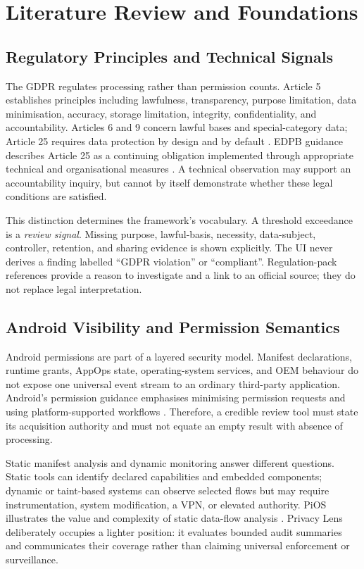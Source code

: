 \section{Literature Review and Foundations}

\subsection{Regulatory Principles and Technical Signals}

The GDPR regulates processing rather than permission counts. Article 5 establishes principles including lawfulness, transparency, purpose limitation, data minimisation, accuracy, storage limitation, integrity, confidentiality, and accountability. Articles 6 and 9 concern lawful bases and special-category data; Article 25 requires data protection by design and by default \cite{eurlex2016}. EDPB guidance describes Article 25 as a continuing obligation implemented through appropriate technical and organisational measures \cite{edpb2019}. A technical observation may support an accountability inquiry, but cannot by itself demonstrate whether these legal conditions are satisfied.

This distinction determines the framework's vocabulary. A threshold exceedance is a \emph{review signal}. Missing purpose, lawful-basis, necessity, data-subject, controller, retention, and sharing evidence is shown explicitly. The UI never derives a finding labelled ``GDPR violation'' or ``compliant''. Regulation-pack references provide a reason to investigate and a link to an official source; they do not replace legal interpretation.

\subsection{Android Visibility and Permission Semantics}

Android permissions are part of a layered security model. Manifest declarations, runtime grants, AppOps state, operating-system services, and OEM behaviour do not expose one universal event stream to an ordinary third-party application. Android's permission guidance emphasises minimising permission requests and using platform-supported workflows \cite{androidpermissions2026}. Therefore, a credible review tool must state its acquisition authority and must not equate an empty result with absence of processing.

Static manifest analysis and dynamic monitoring answer different questions. Static tools can identify declared capabilities and embedded components; dynamic or taint-based systems can observe selected flows but may require instrumentation, system modification, a VPN, or elevated authority. PiOS illustrates the value and complexity of static data-flow analysis \cite{49}. Privacy Lens deliberately occupies a lighter position: it evaluates bounded audit summaries and communicates their coverage rather than claiming universal enforcement or surveillance.

